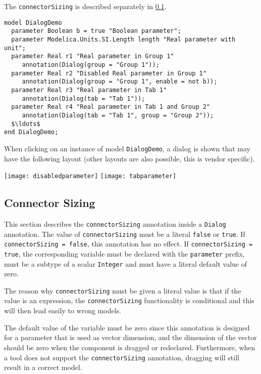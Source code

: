 The \lstinline!connectorSizing! is described separately in \cref{connector-sizing}.

\begin{example}
\begin{lstlisting}[language=modelica]
model DialogDemo
  parameter Boolean b = true "Boolean parameter";
  parameter Modelica.Units.SI.Length length "Real parameter with unit";
  parameter Real r1 "Real parameter in Group 1"
     annotation(Dialog(group = "Group 1"));
  parameter Real r2 "Disabled Real parameter in Group 1"
     annotation(Dialog(group = "Group 1", enable = not b));
  parameter Real r3 "Real parameter in Tab 1"
     annotation(Dialog(tab = "Tab 1"));
  parameter Real r4 "Real parameter in Tab 1 and Group 2"
     annotation(Dialog(tab = "Tab 1", group = "Group 2"));
  $\ldots$
end DialogDemo;
\end{lstlisting}
When clicking on an instance of model \lstinline!DialogDemo!, a dialog is shown that may have the following layout (other layouts are also possible, this is vendor specific).

\begin{center}
\texttt{[image: disabledparameter]}
\quad
\texttt{[image: tabparameter]}\\
\end{center}
\end{example}

\subsection{Connector Sizing}\label{connector-sizing}

This section describes the \lstinline!connectorSizing! annotation inside a \lstinline!Dialog! annotation.
The value of \lstinline!connectorSizing! must be a literal \lstinline!false! or \lstinline!true!.
If \lstinline!connectorSizing = false!, this annotation has no effect.
If \lstinline!connectorSizing = true!, the corresponding variable must be declared with the \lstinline!parameter! prefix, must be a subtype of a scalar \lstinline!Integer! and must have a literal default value of zero.

\begin{nonnormative}
The reason why \lstinline!connectorSizing! must be given a literal value is that if the value is an expression,
the \lstinline!connectorSizing! functionality is conditional and this will then lead easily to wrong models.

The default value of the variable must be zero since this annotation
is designed for a parameter that is used as vector dimension, and the
dimension of the vector should be zero when the component is dragged or
redeclared.  Furthermore, when a tool does not support the
\lstinline!connectorSizing! annotation, dragging will still result in a correct
model.
\end{nonnormative}

